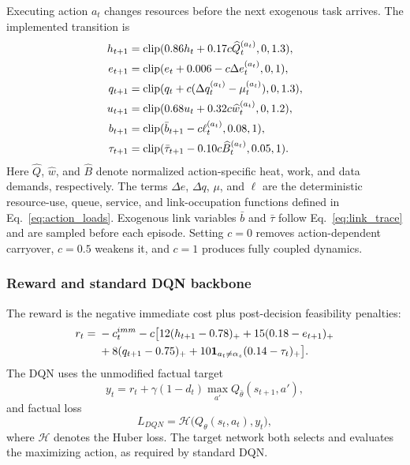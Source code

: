 \documentclass[remotesensing,article,submit,moreauthors]{Definitions/mdpi}
\DeclareMathOperator{\clip}{clip}
\begin{document}
Executing action $a_t$ changes resources before the next exogenous task arrives. The implemented transition is
\begin{align}
h_{t+1}&=\clip(0.86h_t+0.17c\widehat Q_t^{(a_t)},0,1.3),\notag\\
e_{t+1}&=\clip(e_t+0.006-c\Delta e_t^{(a_t)},0,1),\notag\\
q_{t+1}&=\clip(q_t+c(\Delta q_t^{(a_t)}-\mu_t^{(a_t)}),0,1.3),\notag\\
u_{t+1}&=\clip(0.68u_t+0.32c\widehat w_t^{(a_t)},0,1.2),\notag\\
b_{t+1}&=\clip(\bar b_{t+1}-c\ell_t^{(a_t)},0.08,1),\notag\\
\tau_{t+1}&=\clip(\bar\tau_{t+1}-0.10c\widehat B_t^{(a_t)},0.05,1).
\label{eq:transition}
\end{align}
Here $\widehat Q$, $\widehat w$, and $\widehat B$ denote normalized action-specific heat, work, and data demands, respectively. The terms $\Delta e$, $\Delta q$, $\mu$, and $\ell$ are the deterministic resource-use, queue, service, and link-occupation functions defined in Eq.~\eqref{eq:action_loads}. Exogenous link variables $\bar b$ and $\bar\tau$ follow Eq.~\eqref{eq:link_trace} and are sampled before each episode. Setting $c=0$ removes action-dependent carryover, $c=0.5$ weakens it, and $c=1$ produces fully coupled dynamics.

\subsubsection{Reward and standard DQN backbone}

The reward is the negative immediate cost plus post-decision feasibility penalties:
\begin{align}
r_t={}&-c_t^{imm}-c\big[12(h_{t+1}-0.78)_+ +15(0.18-e_{t+1})_+\notag\\
&+8(q_{t+1}-0.75)_+ +10\mathbf 1_{a_t\ne\alpha_s}(0.14-\tau_t)_+\big].
\label{eq:reward}
\end{align}
The DQN uses the unmodified factual target
\begin{equation}
y_t=r_t+\gamma(1-d_t)\max_{a'}Q_{\bar\theta}(s_{t+1},a'),
\label{eq:factual}
\end{equation}
and factual loss
\begin{equation}
L_{DQN}=\mathcal H\big(Q_\theta(s_t,a_t),y_t\big),
\end{equation}
where $\mathcal H$ denotes the Huber loss. The target network both selects and evaluates the maximizing action, as required by standard DQN.
\end{document}
